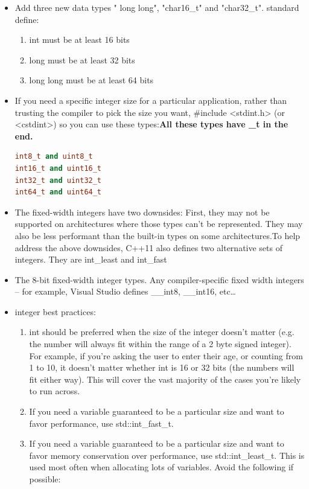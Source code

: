 \documentclass[a4paper,11pt,twoside]{book}
\begin{document}
\begin{itemize}
\item Add three new data types " long long", "char16\_t"  and "char32\_t". standard define:
\begin{enumerate}
\item int must be at least 16 bits
\item long must be at least 32 bits
\item long long must be at least 64 bits
\end{enumerate}

\item If you need a specific integer size for a particular application, rather than trusting the compiler to pick the size you want, \#include <stdint.h> (or <cstdint>) so you can use these types:\textbf{All these types have \_t in the end.}
\begin{lstlisting}[frame=single, language=c++]
int8_t and uint8_t
int16_t and uint16_t
int32_t and uint32_t
int64_t and uint64_t
\end{lstlisting}

\item The fixed-width integers have two downsides: First, they may not be supported on architectures where those types can't be represented. They may also be less performant than the built-in types on some architectures.To help address the above downsides, C++11 also defines two alternative sets of integers. They are int\_least and int\_fast  

\item The 8-bit fixed-width integer types.
Any compiler-specific fixed width integers -- for example, Visual Studio defines \_\_int8, \_\_int16, etc…


\item integer best practices:
\begin{enumerate}
	\item int should be preferred when the size of the integer doesn't matter (e.g. the number will always fit within the range of a 2 byte signed integer). For example, if you're asking the user to enter their age, or counting from 1 to 10, it doesn't matter whether int is 16 or 32 bits (the numbers will fit either way). This will cover the vast majority of the cases you're likely to run across.
	
	\item If you need a variable guaranteed to be a particular size and want to favor performance, use std::int\_fast\_t.
	
	\item If you need a variable guaranteed to be a particular size and want to favor memory conservation over performance, use std::int\_least\_t. This is used most often when allocating lots of variables.
	Avoid the following if possible:
	

\end{enumerate}
\end{itemize}
\end{document}
